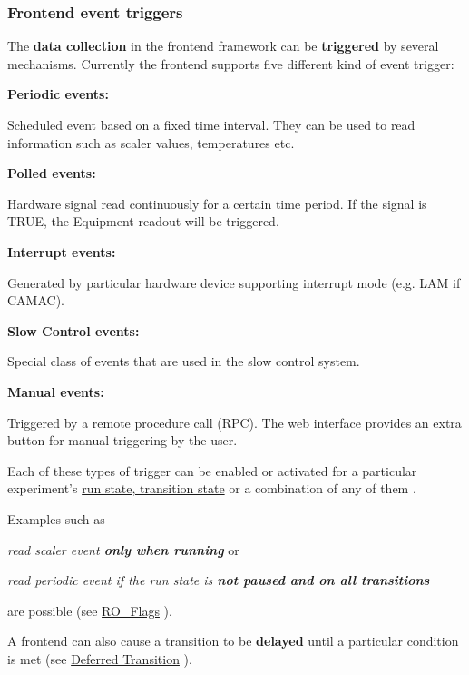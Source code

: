 \label{FrontendOperation_idx_frontend_event_triggers}
\hypertarget{FrontendOperation_idx_frontend_event_triggers}{}
 \hypertarget{FrontendOperation_FE_event_trigger}{}\subsubsection{Frontend event triggers}\label{FrontendOperation_FE_event_trigger}
The {\bfseries  data collection } in the frontend framework can be {\bfseries triggered} by several mechanisms. Currently the frontend supports five different kind of event trigger: 
\begin{DoxyItemize}
\item {\bfseries  Periodic events: } \par
 Scheduled event based on a fixed time interval. They can be used to read information such as scaler values, temperatures etc. 
\item {\bfseries  Polled events: } \par
 Hardware signal read continuously for a certain time period. If the signal is TRUE, the Equipment readout will be triggered. 
\item {\bfseries  Interrupt events: } \par
 Generated by particular hardware device supporting interrupt mode (e.g. LAM if CAMAC). 
\item {\bfseries  Slow Control events: } \par
 Special class of events that are used in the slow control system. 
\item {\bfseries  Manual events: } \par
 Triggered by a remote procedure call (RPC). The web interface provides an extra button for manual triggering by the user. 
\end{DoxyItemize}

Each of these types of trigger can be enabled or activated for a particular experiment's \hyperlink{RC_Run_States_and_Transitions}{run state, transition state} or a combination of any of them .

Examples such as
\begin{DoxyItemize}
\item {\itshape  read scaler event {\bfseries only when running} \/} or
\item {\itshape  read periodic event if the run state is {\bfseries  not paused and on all transitions} \/}
\end{DoxyItemize}

are possible (see \hyperlink{FE_table_FE_tbl_ReadOn}{RO\_\-Flags} ). \par
 A frontend can also cause a transition to be {\bfseries delayed} until a particular condition is met (see \hyperlink{FE_event_notification_FE_Deferred_Transition}{Deferred Transition} ).

